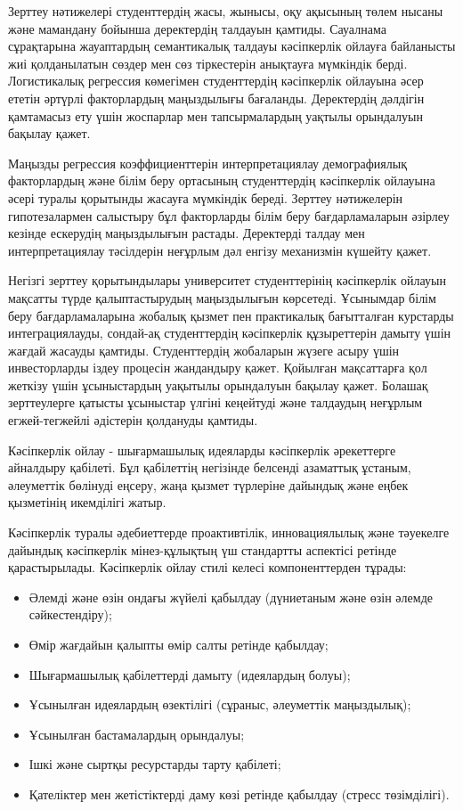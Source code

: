 \begin{multicols}{2}
Зерттеу нәтижелері студенттердің жасы, жынысы, оқу ақысының төлем нысаны
және мамандану бойынша деректердің талдауын қамтиды. Сауалнама
сұрақтарына жауаптардың семантикалық талдауы кәсіпкерлік ойлауға
байланысты жиі қолданылатын сөздер мен сөз тіркестерін анықтауға
мүмкіндік берді. Логистикалық регрессия көмегімен студенттердің
кәсіпкерлік ойлауына әсер ететін әртүрлі факторлардың маңыздылығы
бағаланды. Деректердің дәлдігін қамтамасыз ету үшін жоспарлар мен
тапсырмалардың уақтылы орындалуын бақылау қажет.

Маңызды регрессия коэффициенттерін интерпретациялау демографиялық
факторлардың және білім беру ортасының студенттердің кәсіпкерлік
ойлауына әсері туралы қорытынды жасауға мүмкіндік береді. Зерттеу
нәтижелерін гипотезалармен салыстыру бұл факторларды білім беру
бағдарламаларын әзірлеу кезінде ескерудің маңыздылығын растады.
Деректерді талдау мен интерпретациялау тәсілдерін неғұрлым дәл енгізу
механизмін күшейту қажет.

Негізгі зерттеу қорытындылары университет студенттерінің кәсіпкерлік
ойлауын мақсатты түрде қалыптастырудың маңыздылығын көрсетеді. Ұсынымдар
білім беру бағдарламаларына жобалық қызмет пен практикалық бағытталған
курстарды интеграциялауды, сондай-ақ студенттердің кәсіпкерлік
құзыреттерін дамыту үшін жағдай жасауды қамтиды. Студенттердің жобаларын
жүзеге асыру үшін инвесторларды іздеу процесін жандандыру қажет.
Қойылған мақсаттарға қол жеткізу үшін ұсыныстардың уақытылы орындалуын
бақылау қажет. Болашақ зерттеулерге қатысты ұсыныстар үлгіні кеңейтуді
және талдаудың неғұрлым егжей-тегжейлі әдістерін қолдануды қамтиды.

Кәсіпкерлік ойлау - шығармашылық идеяларды кәсіпкерлік әрекеттерге
айналдыру қабілеті. Бұл қабілеттің негізінде белсенді азаматтық ұстаным,
әлеуметтік бөлінуді еңсеру, жаңа қызмет түрлеріне дайындық және еңбек
қызметінің икемділігі жатыр.

Кәсіпкерлік туралы әдебиеттерде проактивтілік, инновациялылық және
тәуекелге дайындық кәсіпкерлік мінез-құлықтың үш стандартты аспектісі
ретінде қарастырылады. Кәсіпкерлік ойлау стилі келесі компоненттерден
тұрады:

\begin{itemize}[left=0.5cm]
\item
  Әлемді және өзін ондағы жүйелі қабылдау (дүниетаным және өзін әлемде
  сәйкестендіру);
\item
  Өмір жағдайын қалыпты өмір салты ретінде қабылдау;
\item
  Шығармашылық қабілеттерді дамыту (идеялардың болуы);
\item
  Ұсынылған идеялардың өзектілігі (сұраныс, әлеуметтік маңыздылық);
\item
  Ұсынылған бастамалардың орындалуы;
\item
  Ішкі және сыртқы ресурстарды тарту қабілеті;
\item
  Қателіктер мен жетістіктерді даму көзі ретінде қабылдау (стресс
  төзімділігі).
\end{itemize}


\end{multicols}
